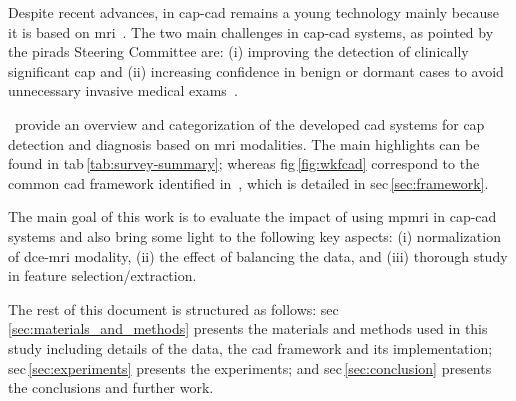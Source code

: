 \documentclass[a4paper,num-refs]{wiley-article}
\begin{document}
Despite recent advances, in \ac{cap}-\ac{cad} remains a young technology mainly
because it is based on \ac{mri}~\cite{Hegde2013}.
%
The two main challenges in \ac{cap}-\ac{cad} systems, as pointed by the
\ac{pirads} Steering Committee are: (i) improving the detection of clinically
significant \ac{cap} and (ii) increasing confidence in benign or dormant cases
to avoid unnecessary invasive medical exams~\citep{weinreb2016pi}.

\citeauthor{lemaitre2015computer}\,\cite{lemaitre2015computer} provide an
overview and categorization of the developed \acs{cad} systems for \ac{cap}
detection and diagnosis based on \ac{mri} modalities.
The main highlights can be
found in \acs{tab}\,\ref{tab:survey-summary};
whereas
\acs{fig}\,\ref{fig:wkfcad} correspond to the common \ac{cad} framework
identified in~\cite{lemaitre2015computer}, which is detailed in \acs{sec}\,\ref{sec:framework}.

The main goal of this work is to evaluate the impact of using \ac{mpmri} in
\ac{cap}-\ac{cad} systems and also bring some light to the following key aspects:
(i) normalization of \ac{dce}-\ac{mri} modality,
(ii) the effect of balancing the data,
and (iii) thorough study in feature selection/extraction.

The rest of this document is structured as follows:
\acs{sec}\,\ref{sec:materials_and_methods} presents the materials and methods used in
this study including details of the data, the \ac{cad} framework and its
implementation; \acs{sec}\,\ref{sec:experiments} presents the experiments; and
\ac{sec}\,\ref{sec:conclusion} presents the conclusions and further work.
\end{document}
